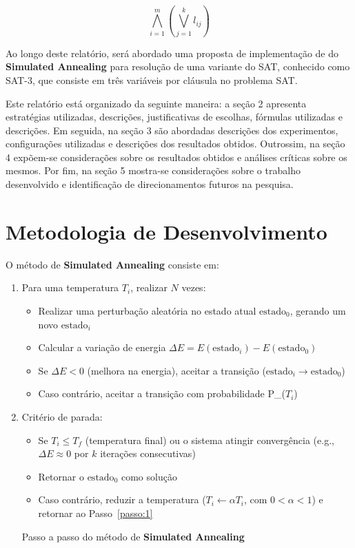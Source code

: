 \documentclass[12pt]{article}
\begin{document}
\begin{equation}
\bigwedge_{i=1}^{m} \left( \bigvee_{j=1}^{k} l_{ij} \right)
\end{equation}

Ao longo deste relatório, será abordado uma proposta de implementação de do \textbf{Simulated Annealing} para resolução de uma variante do SAT, conhecido como SAT-3, que consiste em três variáveis por cláusula no problema SAT.

Este relatório está organizado da seguinte maneira: a seção 2 apresenta estratégias utilizadas, descrições, justificativas de escolhas, fórmulas utilizadas e descrições. Em seguida, na seção 3 são abordadas descrições dos experimentos, configurações utilizadas e descrições dos resultados obtidos. Outrossim, na seção 4 expõem-se considerações sobre os resultados obtidos e análises críticas sobre os mesmos. Por fim, na seção 5 mostra-se considerações sobre o trabalho desenvolvido e identificação de direcionamentos futuros na pesquisa.



\section{Metodologia de Desenvolvimento}
\label{sec:metodologia_de_desenvolvimento}

O método de \textbf{Simulated Annealing} consiste em:
\begin{enumerate}
  
  \item Para uma temperatura $T_i$, realizar $N$ vezes: \label{passo:1}
  \begin{itemize}
    \item Realizar uma perturbação aleatória no estado atual $\text{estado}_0$, gerando um novo $\text{estado}_i$
    \item Calcular a variação de energia $\Delta E = E(\text{estado}_i) - E(\text{estado}_0)$
    \item Se $\Delta E < 0$ (melhora na energia), aceitar a transição ($\text{estado}_i \rightarrow \text{estado}_0$)
    \item Caso contrário, aceitar a transição com probabilidade P_{}($T_i$)
  \end{itemize}
  
  \item Critério de parada:
  \begin{itemize}
    \item Se $T_i \leq T_f$ (temperatura final) ou o sistema atingir convergência (e.g., $\Delta E \approx 0$ por $k$ iterações consecutivas)
    \item Retornar o $\text{estado}_0$ como solução
    \item Caso contrário, reduzir a temperatura ($T_i \leftarrow \alpha T_i$, com $0 < \alpha < 1$) e retornar ao Passo~\ref{passo:1}
  \end{itemize}
  \label{pseudocodigo}
  \caption{Passo a passo do método de \textbf{Simulated Annealing}}
\end{enumerate} 
\end{document}
